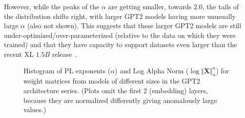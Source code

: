 However, while the peaks of the $\alpha$ are getting smaller, towards $2.0$, the tails of the distribution shifts right, with larger GPT2 models having more unusually large $\alpha$ (also not shown). 
This suggests that these larger GPT2 models are still under-optimized/over-parameterized (relative to the data on which they were trained) and that they have capacity to support datasets even larger than the recent XL $1.5B$ release~\cite{gpt2-xl}.

\begin{figure}[htb]
    \centering

    \quad
    \caption{Histogram of PL exponents ($\alpha$)
              and Log Alpha Norm ($\log\Vert\mathbf{X}\Vert_{\alpha}^{\alpha}$) for weight matrices from models of different sizes in the GPT2 architecture series.  (Plots omit the first 2 (embedding) layers, because they are normalized differently giving anomalously large values.)
             }
    \label{fig:gpt2-histograms}
\end{figure}
